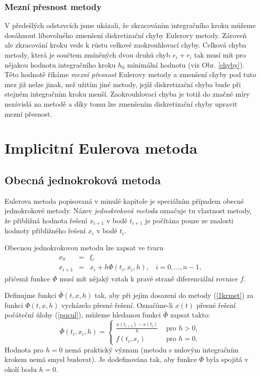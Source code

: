 \documentclass[a4paper, 12pt]{book}
\theoremstyle{definition}
\begin{document}
\subsubsection{Mezní přesnost metody}
V předešlých odstavcích jsme ukázali, že zkracováním integračního kroku můžeme
dosáhnout libovolného zmenšení diskretizační chyby Eulerovy metody. Zároveň 
ale zkracování kroku vede k růstu celkové zaokrouhlovací chyby. Celková chyba 
metody, která je součtem zmíněných dvou druhů chyb $e_i+r_i$ tak musí mít
pro nějakou hodnotu integračního kroku $h_0$ minimální hodnotu (viz Obr. \ref{chyby}). 
Této hodnotě říkáme {\em mezní přesnost} Eulerovy metody a zmenšení chyby pod tuto 
mez již nelze jinak, než užitím jiné metody, jejíž diskretizační chyba bude při
stejném integračním kroku menší. Zaokrouhlovací chyba je totiž do značné míry 
nezávislá na metodě a díky tomu lze zmenšením diskretizační chyby upravit mezní 
přesnost.


\section{Implicitní Eulerova metoda}




\subsection{Obecná jednokroková metoda}
Eulerova metoda popisovaná v minulé kapitole je speciálním případem obecné 
jednokrokové metody. Název {\em jednokroková metoda} označuje tu vlastnost metody,
že přibližná hodnota řešení $x_{i+1}$ v bodě $t_{i+1}$ je počítána pouze ze 
znalosti hodnoty přibližného řešení $x_i$ v bodě $t_i$.

Obecnou jednokrokovou metodu lze zapsat ve tvaru
\begin{equation}\label{1krmet}
\begin{array}{crl}
x_0 & =& \xi,\\
x_{i+1} &=&x_i+h \Phi(t_i,x_i,h),~~~~ i=0,\dots,n-1,
\end{array}
\end{equation}
přičemž funkce $\Phi$ musí mít nějaký vztah k pravé straně diferenciální rovnice $f$.

Definujme funkci $\bar\Phi(t,x,h)$ tak, aby při jejím dosazení do metody (\ref{1krmet}) 
za funkci $\Phi(t,x,h)$ vycházelo přesné řešení. Označíme-li $x(t)$ přesné řešení 
počáteční úlohy (\ref{pocul}), můžeme hledanou funkci $\bar\Phi$ zapsat takto:
\begin{equation}\label{delta}
\bar\Phi(t_i,x_i,h) = \left\{\begin{array}{ll}
\frac{x(t_{i+1})-x(t_i)}{h}&\mbox { pro }h>0,\\
f(t_i,x_i)&\mbox { pro }h=0.
\end{array}\right.
\end{equation}
Hodnota pro $h=0$ nemá praktický význam (metodu s nulovým integračním krokem nemá 
smysl budovat). Je dodefinována tak, aby funkce $\bar\Phi$ byla spojitá v okolí bodu 
$h=0$.
\end{document}

